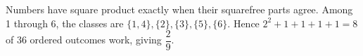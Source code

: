 Numbers have square product exactly when their squarefree parts agree. Among 1 through 6, the classes are $\{1,4\},\{2\},\{3\},\{5\},\{6\}$. Hence $ 2^2+1+1+1+1=8 $ of 36 ordered outcomes work, giving $\boxed{\dfrac{2}{9}}$.
